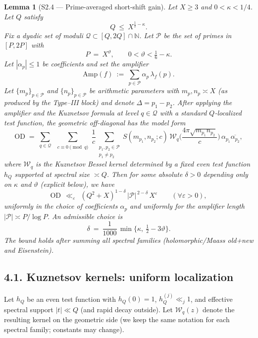 \documentclass[11pt]{article}
\newtheorem{lemma}{Lemma}[section]
\theoremstyle{definition}
\theoremstyle{remark}
\begin{document}
\begin{lemma}[S2.4 — Prime-averaged short-shift gain]
Let $X\ge 3$ and $0<\kappa<1/4$. Let $Q$ satisfy
\[
Q\ \le\ X^{\frac12-\kappa}.
\]
Fix a dyadic set of moduli $\mathcal Q\subset[Q,2Q]\cap\mathbb N$. Let $\mathcal P$ be the set of primes in $[P,2P]$ with
\[
P\ =\ X^\vartheta,\qquad 0<\vartheta<\tfrac16-\kappa.
\]
Let $|\alpha_p|\le 1$ be coefficients and set the amplifier
\[
\mathrm{Amp}(f)\ :=\ \sum_{p\in\mathcal P}\alpha_p\,\lambda_f(p).
\]
Let $\{m_{p}\}_{p\in\mathcal P}$ and $\{n_{p}\}_{p\in\mathcal P}$ be arithmetic parameters with $m_{p},n_{p}\asymp X$ (as produced by the Type–III block) and denote $\Delta=p_1-p_2$. After applying the amplifier and the Kuznetsov formula at level $q\in\mathcal Q$ with a standard $Q$-localized test function, the geometric off-diagonal has the model form
\[
\mathrm{OD}\;=\;\sum_{q\in\mathcal Q}\;\sum_{\substack{c\equiv 0\pmod q}}\frac{1}{c}
\sum_{\substack{p_1,p_2\in\mathcal P\\ p_1\neq p_2}}
S(m_{p_1},n_{p_2};c)\,\mathcal W_q\!\Big(\frac{4\pi\sqrt{m_{p_1}n_{p_2}}}{c}\Big)\,\alpha_{p_1}\overline{\alpha_{p_2}},
\]
where $\mathcal W_q$ is the Kuznetsov Bessel kernel determined by a fixed even test function $h_Q$ supported at spectral size $\asymp Q$. Then for some absolute $\delta>0$ depending only on $\kappa$ and $\vartheta$ (explicit below), we have
\begin{equation}\label{eq:s24}
\mathrm{OD}\ \ \ll_\varepsilon\ \ (Q^2+X)^{1-\delta}\,|\mathcal P|^{\,2-\delta}\,X^\varepsilon
\qquad(\forall\varepsilon>0),
\end{equation}
uniformly in the choice of coefficients $\alpha_p$ and uniformly for the amplifier length $|\mathcal P|\asymp P/\log P$.
An admissible choice is
\[
\delta\ =\ \frac{1}{1000}\,\min\!\Big\{\kappa,\ \tfrac12-3\vartheta\Big\}.
\]
The bound holds after summing all spectral families (holomorphic/Maass old+new and Eisenstein).
\end{lemma}

\subsection*{4.1. Kuznetsov kernels: uniform localization}
Let $h_Q$ be an even test function with $h_Q(0)=1$, $h_Q^{(j)}\ll_j 1$, and effective spectral support $|t|\ll Q$ (and rapid decay outside).
Let $\mathcal W_q(z)$ denote the resulting kernel on the geometric side (we keep the same notation for each spectral family; constants may change).
\end{document}
